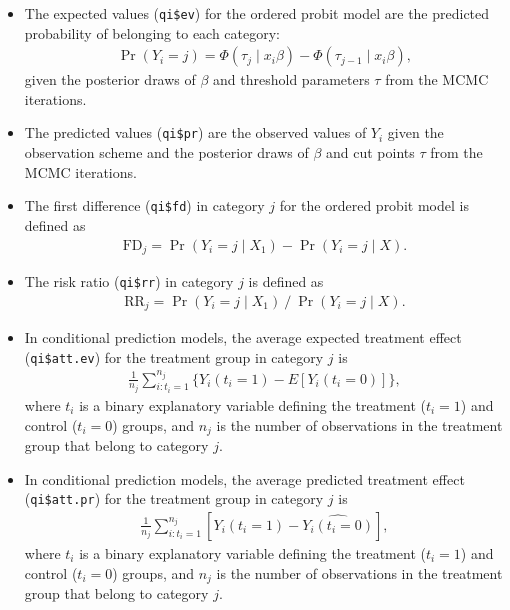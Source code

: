 \begin{itemize}
\item The expected values (\texttt{qi\$ev}) for the ordered probit model are
the predicted probability of belonging to each category:
\begin{eqnarray*}
\Pr(Y_i=j)= \Phi(\tau_j \mid x_i \beta)-\Phi(\tau_{j-1} \mid x_i \beta),
\end{eqnarray*}
given the posterior draws of $\beta$ and threshold parameters $\tau$
from the MCMC iterations.

\item The predicted values (\texttt{qi\$pr}) are the observed values of 
$Y_i$ given the observation scheme and the posterior draws of $\beta$
and cut points $\tau$ from the MCMC iterations.

\item The first difference (\texttt{qi\$fd}) in category $j$ for the 
ordered probit model is defined as
\begin{eqnarray*}
\text{FD}_j=\Pr(Y_i=j\mid X_{1})-\Pr(Y_i=j\mid X).
\end{eqnarray*}

\item The risk ratio (\texttt{qi\$rr}) in category $j$ is defined as
\begin{eqnarray*}
\text{RR}_j=\Pr(Y_i=j\mid X_{1})\ /\ \Pr(Y_i=j\mid X).
\end{eqnarray*}


\item In conditional prediction models, the average expected treatment effect
(\texttt{qi\$att.ev}) for the treatment group in category $j$ is
\begin{eqnarray*}
\frac{1}{n_j}\sum_{i:t_{i}=1}^{n_j} \{
Y_{i}(t_{i}=1)-E[Y_{i}(t_{i}=0)] \},
\end{eqnarray*}
where $t_{i}$ is a binary explanatory variable defining the treatment
($t_{i}=1$) and control ($t_{i}=0$) groups, and $n_j$ is the 
number of observations in the treatment group that belong to category $j$.

\item In conditional prediction models, the average predicted treatment effect
(\texttt{qi\$att.pr}) for the treatment group in category $j$ is
\begin{eqnarray*}
\frac{1}{n_j}\sum_{i:t_{i}=1}^{n_j}[Y_{i}(t_{i}=1)-\widehat{Y_{i}(t_{i}=0)}],
\end{eqnarray*}
where $t_{i}$ is a binary explanatory variable defining the treatment
($t_{i}=1$) and control ($t_{i}=0$) groups, and $n_j$ is the 
number of observations in the treatment group that belong to category $j$.
\end{itemize}

